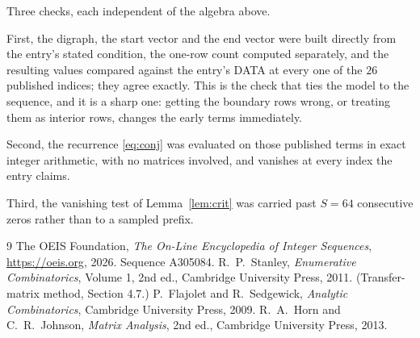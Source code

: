 \documentclass[11pt,a4paper]{article}
\theoremstyle{plain}
\theoremstyle{definition}
\begin{document}
Three checks, each independent of the algebra above.

First, the digraph, the start vector and the end vector were built directly from the
entry's stated condition, the one-row count computed separately, and the resulting values
compared against the entry's DATA at every one of the $26$ published indices; they
agree exactly. This is the check that ties the model to the sequence, and it is a sharp one:
getting the boundary rows wrong, or treating them as interior rows, changes the early terms
immediately.

Second, the recurrence \eqref{eq:conj} was evaluated on those published terms in exact
integer arithmetic, with no matrices involved, and vanishes at every index the entry claims.

Third, the vanishing test of Lemma~\ref{lem:crit} was carried past $S=64$ consecutive
zeros rather than to a sampled prefix.

\begin{thebibliography}{9}
 The OEIS Foundation, \emph{The On-Line Encyclopedia of Integer
Sequences}, \url{https://oeis.org}, 2026. Sequence A305084.
 R.~P.~Stanley, \emph{Enumerative Combinatorics}, Volume 1, 2nd ed.,
Cambridge University Press, 2011. (Transfer-matrix method, Section 4.7.)
 P.~Flajolet and R.~Sedgewick, \emph{Analytic Combinatorics}, Cambridge
University Press, 2009.
 R.~A.~Horn and C.~R.~Johnson, \emph{Matrix Analysis}, 2nd ed., Cambridge
University Press, 2013.
\end{thebibliography}
\end{document}
